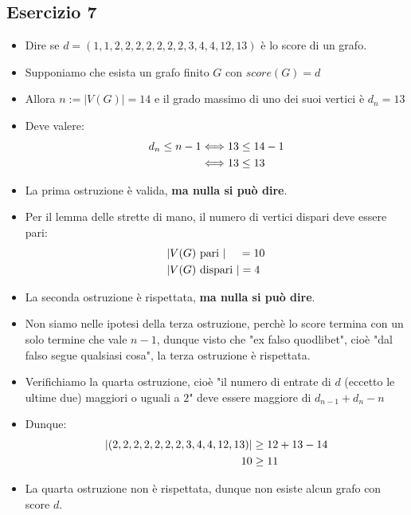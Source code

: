 \documentclass[10pt]{article}
\begin{document}
	\subsection{Esercizio 7}
	\begin{itemize}
	\item
	Dire se $d = (1,1,2,2,2,2,2,2,2,3,4,4,12,13)$ è lo score di un grafo.
	\item
	Supponiamo che esista un grafo finito $G$ con $score(G) = d$
	\item
	Allora $n := |V(G)| = 14$ e il grado massimo di uno dei suoi vertici è $d_n = 13$
	\item
	Deve valere:
	\begin{equation}
	\begin{split}
		d_n \leq n - 1 &\Longleftrightarrow 13 \leq 14 - 1  \\
		&\Longleftrightarrow 13 \leq 13
		\notag
		\end{split}
	\end{equation}
	\item
	La prima ostruzione è valida, \textbf{ma nulla si può dire}.
	\item
	Per il lemma delle strette di mano, il numero di vertici dispari deve essere pari:
	\begin{equation}
	\begin{split}
		|&V(G) \textrm{ pari }| \quad\, =  10\\
		|&V(G) \textrm{ dispari }| = 4 
		\notag
		\end{split}
	\end{equation}
	\item
	La seconda ostruzione è rispettata, \textbf{ma nulla si può dire}.
	\item
	Non siamo nelle ipotesi della terza ostruzione, perchè lo score termina con un solo termine che vale $n-1$, dunque visto che "ex falso quodlibet", cioè "dal falso segue qualsiasi cosa", la terza ostruzione è rispettata.
	\item
	Verifichiamo la quarta ostruzione, cioè "il numero di entrate di $d$ (eccetto le ultime due) maggiori o uguali a $2$" deve essere maggiore di $d_{n-1} + d_n - n$
	\item
	Dunque:
	\begin{equation}
	\begin{split}
		|(2,2,2,2,2,2,2,3,4,4,12,13)| &\geq 12+13-14 \\
		10 &\geq 11
		\notag
		\end{split}
	\end{equation}
	\item
	La quarta ostruzione non è rispettata, dunque non esiste alcun grafo con score $d$.
	\end{itemize}
	
\end{document}

